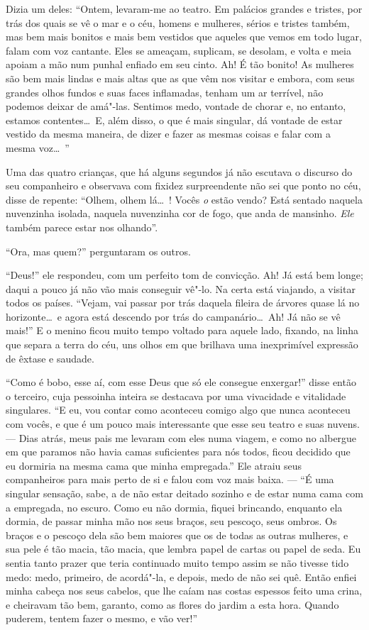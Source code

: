 Dizia um deles: “Ontem, levaram-me ao teatro. Em palácios
grandes e tristes, por trás dos quais se vê o mar e o céu, homens e
mulheres, sérios e tristes também, mas bem mais bonitos e mais bem 
vestidos que aqueles que vemos em todo lugar, falam com voz
cantante. Eles se ameaçam, suplicam, se desolam, e volta e meia apoiam
a mão num punhal enfiado em seu cinto. Ah! É tão bonito!
As mulheres são bem mais lindas e mais altas que as que
vêm nos visitar e embora, com seus grandes olhos fundos e suas faces
inflamadas, tenham um ar terrível, não podemos deixar de amá"-las.
Sentimos medo, vontade de chorar e, no entanto, estamos contentes\ldots\  E,
além disso, o que é mais singular, dá vontade de estar vestido da mesma
maneira, de dizer e fazer as mesmas coisas e falar com a mesma
voz\ldots\ ”

Uma das quatro crianças, que há alguns segundos já não escutava o
discurso do seu companheiro e observava com fixidez surpreendente não
sei que ponto no céu, disse de repente: “Olhem, olhem
lá\ldots\ ! Vocês \textit{o} estão vendo? Está sentado naquela nuvenzinha isolada,
naquela nuvenzinha cor de fogo, que anda de mansinho. \textit{Ele} também
parece estar nos olhando''.

“Ora, mas quem?'' perguntaram os outros.

“Deus!'' ele respondeu, com um perfeito tom de
convicção. Ah! Já está bem longe; daqui a pouco
já não vão mais conseguir vê"-lo. Na certa está viajando, a
visitar todos os países. “Vejam, vai passar por trás daquela fileira
de árvores quase lá no horizonte\ldots\  e agora está descendo por
trás do campanário\ldots\  Ah! Já não se vê mais!'' E
o menino ficou muito tempo voltado para aquele lado, fixando, na linha
que separa a terra do céu, uns olhos em que brilhava uma inexprimível
expressão de êxtase e saudade.

“Como é bobo, esse aí, com esse Deus que só ele consegue
enxergar!'' disse então o terceiro, cuja pessoinha inteira
se destacava por uma vivacidade e vitalidade singulares.
“E eu, vou contar como aconteceu comigo algo que
nunca aconteceu com vocês, e que é um pouco mais interessante que esse seu
teatro e suas nuvens. --- Dias atrás, meus pais me levaram com
eles numa viagem, e como no albergue em que paramos não havia camas
suficientes para nós todos, ficou decidido que eu dormiria na mesma
cama que minha empregada.” Ele atraiu seus companheiros
para mais perto de si e falou com voz mais baixa. --- “É
uma singular sensação, sabe, a de não estar deitado sozinho e de estar
numa cama com a empregada, no escuro. Como eu não dormia, fiquei
brincando, enquanto ela dormia, de passar minha mão nos seus braços, 
seu pescoço, seus ombros. Os braços e o pescoço dela são bem
maiores que os de todas as outras mulheres, e sua pele é tão macia, tão
macia, que lembra papel de cartas ou papel de seda. Eu sentia tanto
prazer que teria continuado muito tempo assim se não tivesse tido
medo: medo, primeiro, de acordá"-la, e depois, medo de não sei quê.
Então enfiei minha cabeça nos seus cabelos, que lhe caíam nas costas
espessos feito uma crina, e cheiravam tão bem, garanto, como as
flores do jardim a esta hora. Quando puderem, tentem fazer o mesmo, e vão ver!''

